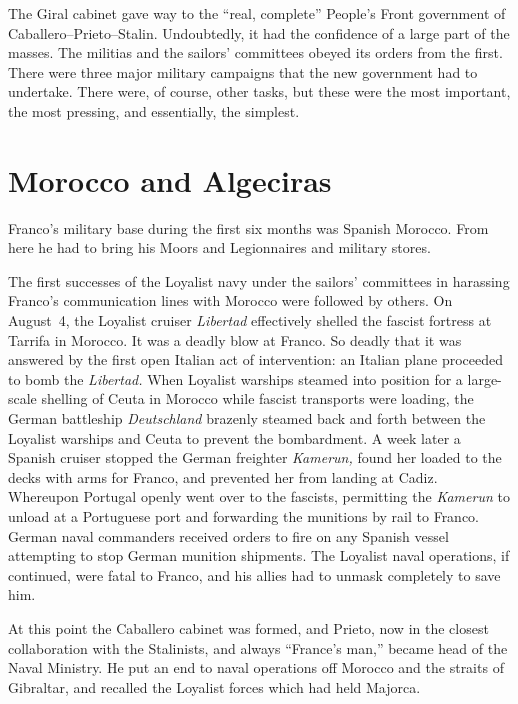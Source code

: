 \indexLCaballero\indexIPrieto{}
The Giral cabinet gave way to the ``real, complete'' People’s Front government of Caballero--Prieto--Stalin. Undoubtedly, it had the confidence of a large part of the masses. The militias and the sailors’ committees obeyed its orders from the first. There were three major military campaigns that the new government had to undertake. There were, of course, other tasks, but these were the most important, the most pressing, and essentially, the simplest.

\section{Morocco and Algeciras}

\indexFFranco{}
Franco’s military base during the first six months was Spanish Morocco. From here he had to bring his Moors and Legionnaires and military stores.

The first successes of the Loyalist navy under the sailors’ committees in harassing Franco’s communication lines with Morocco were followed by others. On August~4, the Loyalist cruiser \emph{Libertad} effectively shelled the fascist fortress at Tarrifa in Morocco. It was a deadly blow at Franco. So deadly that it was answered by the first open Italian act of intervention: an Italian plane proceeded to bomb the \emph{Libertad.} When Loyalist warships steamed into position for a large-scale shelling of Ceuta in Morocco while fascist transports were loading, the German battleship \emph{Deutschland} brazenly steamed back and forth between the Loyalist warships and Ceuta to prevent the bombardment. A week later a Spanish cruiser stopped the German freighter \emph{Kamerun,} found her loaded to the decks with arms for Franco, and prevented her from landing at Cadiz. Whereupon Portugal openly went over to the fascists, permitting the \emph{Kamerun} to unload at a Portuguese port and forwarding the munitions by rail to Franco. German naval commanders received orders to fire on any Spanish vessel attempting to stop German munition shipments. The Loyalist naval operations, if continued, were fatal to Franco, and his allies had to unmask completely to save him.

\indexLCaballero\indexIPrieto{}
At this point the Caballero cabinet was formed, and Prieto, now in the closest collaboration with the Stalinists, and always ``France’s man,\kn\kn'' became head of the Naval Ministry. He put an end to naval operations off Morocco and the straits of Gibraltar\kn, and recalled the Loyalist forces which had held Majorca.

